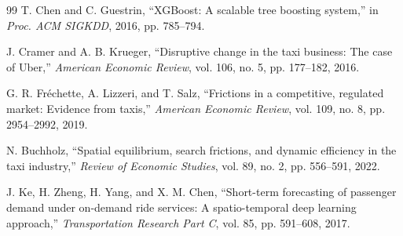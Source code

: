 \documentclass[11pt,a4paper]{article}
\begin{document}
\begin{thebibliography}{99}
T. Chen and C. Guestrin, ``XGBoost: A scalable tree boosting system,'' in \emph{Proc. ACM SIGKDD}, 2016, pp. 785--794.

J. Cramer and A. B. Krueger, ``Disruptive change in the taxi business: The case of Uber,'' \emph{American Economic Review}, vol. 106, no. 5, pp. 177--182, 2016.

G. R. Fr\'echette, A. Lizzeri, and T. Salz, ``Frictions in a competitive, regulated market: Evidence from taxis,'' \emph{American Economic Review}, vol. 109, no. 8, pp. 2954--2992, 2019.

N. Buchholz, ``Spatial equilibrium, search frictions, and dynamic efficiency in the taxi industry,'' \emph{Review of Economic Studies}, vol. 89, no. 2, pp. 556--591, 2022.

J. Ke, H. Zheng, H. Yang, and X. M. Chen, ``Short-term forecasting of passenger demand under on-demand ride services: A spatio-temporal deep learning approach,'' \emph{Transportation Research Part C}, vol. 85, pp. 591--608, 2017.

\end{thebibliography}
\end{document}
